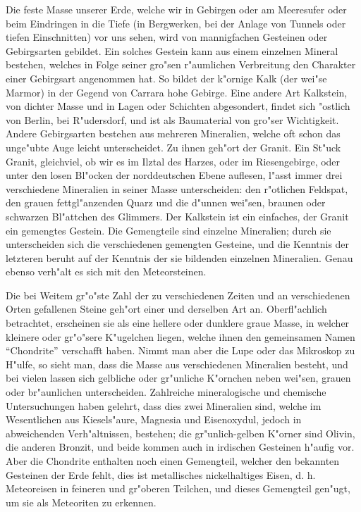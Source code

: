 \documentclass[a4paper, 11pt, oneside]{article}
\begin{document}
Die feste Masse unserer Erde, welche wir in Gebirgen oder am Meeresufer oder beim Eindringen in die Tiefe (in Bergwerken, bei der Anlage von Tunnels oder tiefen Einschnitten) vor uns sehen, wird von mannigfachen Gesteinen oder Gebirgsarten gebildet. Ein solches Gestein kann aus einem einzelnen Mineral bestehen, welches in Folge seiner gro"sen r"aumlichen Verbreitung den Charakter einer Gebirgsart angenommen hat. So bildet der k"ornige Kalk (der wei"se Marmor) in der Gegend von Carrara hohe Gebirge. Eine andere Art Kalkstein, von dichter Masse und in Lagen oder Schichten abgesondert, findet sich "ostlich von Berlin, bei R"udersdorf, und ist als Baumaterial von gro"ser Wichtigkeit. Andere Gebirgsarten bestehen aus mehreren Mineralien, welche oft schon das unge"ubte Auge leicht unterscheidet. Zu ihnen geh"ort der Granit. Ein St"uck Granit, gleichviel, ob wir es im Ilztal des Harzes, oder im Riesengebirge, oder unter den losen Bl"ocken der norddeutschen Ebene auflesen, l"asst immer drei verschiedene Mineralien in seiner Masse unterscheiden: den r"otlichen Feldspat, den grauen fettgl"anzenden Quarz und die d"unnen wei"sen, braunen oder schwarzen Bl"attchen des Glimmers. Der Kalkstein ist ein einfaches, der Granit ein gemengtes Gestein. Die Gemengteile sind einzelne Mineralien; durch sie unterscheiden sich die verschiedenen gemengten Gesteine, und die Kenntnis der letzteren beruht auf der Kenntnis der sie bildenden einzelnen Mineralien. Genau ebenso verh"alt es sich mit den Meteorsteinen.

Die bei Weitem gr"o"ste Zahl der zu verschiedenen Zeiten und an verschiedenen Orten gefallenen Steine geh"ort einer und derselben Art an. Oberfl"achlich betrachtet, erscheinen sie als eine hellere oder dunklere graue Masse, in welcher kleinere oder gr"o"sere K"ugelchen liegen, welche ihnen den gemeinsamen Namen "`Chondrite"' verschafft haben. Nimmt man aber die Lupe oder das Mikroskop zu H"ulfe, so sieht man, dass die Masse aus verschiedenen Mineralien besteht, und bei vielen lassen sich gelbliche oder gr"unliche K"ornchen neben wei"sen, grauen oder br"aunlichen unterscheiden. Zahlreiche mineralogische und chemische Untersuchungen haben gelehrt, dass dies zwei Mineralien sind, welche im Wesentlichen aus Kiesels"aure, Magnesia und Eisenoxydul, jedoch in abweichenden Verh"altnissen, bestehen; die gr"unlich-gelben K"orner sind Olivin, die anderen Bronzit, und beide kommen auch in irdischen Gesteinen h"aufig vor. Aber die Chondrite enthalten noch einen Gemengteil, welcher den bekannten Gesteinen der Erde fehlt, dies ist metallisches nickelhaltiges Eisen, d. h. Meteoreisen in feineren und gr"oberen Teilchen, und dieses Gemengteil gen"ugt, um sie als Meteoriten zu erkennen.
\end{document}
